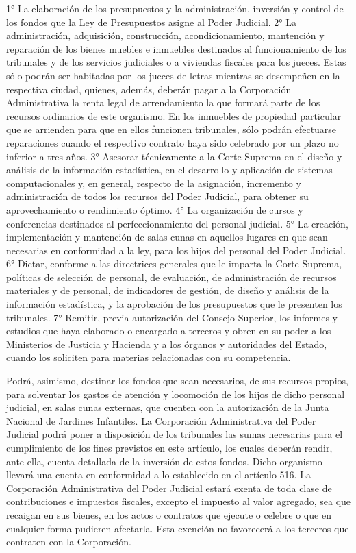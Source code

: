     1°  La elaboración de los presupuestos y la administración, inversión y control de los fondos que la Ley de Presupuestos asigne al Poder Judicial.
    2°  La administración, adquisición, construcción, acondicionamiento, mantención y reparación de los bienes muebles e inmuebles destinados al funcionamiento de los tribunales y de los servicios judiciales o a viviendas fiscales para los jueces. Estas sólo podrán ser habitadas por los jueces de letras mientras se desempeñen en la respectiva ciudad, quienes, además, deberán pagar a la Corporación Administrativa la renta legal de arrendamiento la que formará parte de los recursos ordinarios de este organismo.
        En los inmuebles de propiedad particular que se arrienden para que en ellos funcionen tribunales, sólo podrán efectuarse reparaciones cuando el respectivo contrato haya sido celebrado por un plazo no inferior a tres años.
    3°  Asesorar técnicamente a la Corte Suprema en el diseño y análisis de la información estadística, en el desarrollo y aplicación de sistemas computacionales y, en general, respecto de la asignación, incremento y administración de todos los recursos del Poder Judicial, para obtener su aprovechamiento o rendimiento óptimo.
    4°  La organización de cursos y conferencias destinados al perfeccionamiento del personal judicial.
    5°  La creación, implementación y mantención de salas cunas en aquellos lugares en que sean necesarias en conformidad a la ley, para los hijos del personal del Poder Judicial.
    6°  Dictar, conforme a las directrices generales que le imparta la Corte Suprema, políticas de selección de personal, de evaluación, de administración de recursos materiales y de personal, de indicadores de gestión, de diseño y análisis de la información estadística, y la aprobación de los presupuestos que le presenten los tribunales.
    7°  Remitir, previa autorización del Consejo Superior, los informes y estudios que haya elaborado o encargado a terceros y obren en su poder a los Ministerios de Justicia y Hacienda y a los órganos y autoridades del Estado, cuando los soliciten para materias relacionadas con su competencia.

    Podrá, asimismo, destinar los fondos que sean necesarios, de sus recursos propios, para solventar los gastos de atención y locomoción de los hijos de dicho personal judicial, en salas cunas externas, que cuenten con la autorización de la Junta Nacional de Jardines Infantiles.
    La Corporación Administrativa del Poder Judicial podrá poner a disposición de los tribunales las sumas necesarias para el cumplimiento de los fines previstos en este artículo, los cuales deberán rendir, ante ella, cuenta detallada de la inversión de estos fondos. Dicho organismo llevará una cuenta en conformidad a lo establecido en el artículo 516.
    La Corporación Administrativa del Poder Judicial estará exenta de toda clase de contribuciones e impuestos fiscales, excepto el impuesto al valor agregado, sea que recaigan en sus bienes, en los actos o contratos que ejecute o celebre o que en cualquier forma pudieren afectarla. Esta exención no favorecerá a los terceros que contraten con la Corporación.




